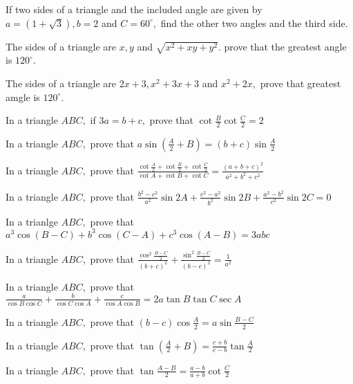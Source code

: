 \item If two sides of a triangle and the included angle are given by $a = (1 + \sqrt{3}), b = 2$ and $C=60^\circ,$ find
    the other two angles and the third side.

\item The sides of a triangle are $x, y$ and $\sqrt{x^2 + xy + y^2}.$ prove that the greatest angle is $120^\circ.$

\item The sides of a triangle are $2x + 3, x^2 + 3x + 3$ and $x^2 + 2x,$ prove that greatest amgle is $120^\circ.$

\item In a triangle $ABC,$ if $3a = b + c,$ prove that $\cot\frac{B}{2}\cot\frac{C}{2} = 2$

\item In a triangle $ABC,$ prove that $a\sin\left(\frac{A}{2} + B\right) = (b + c)\sin\frac{A}{2}$

\item In a triangle $ABC,$ prove that $\frac{\cot\frac{A}{2} + \cot\frac{B}{2} + \cot\frac{C}{2}}{\cot A + \cot B + \cot
    C} = \frac{(a + b + c)^2}{a^2 + b^2 + c^2}$

\item In a triangle $ABC,$ prove that $\frac{b^2 - c^2}{a^2}\sin2A + \frac{c^2 - a^2}{b^2}\sin2B + \frac{a^2 -
    b^2}{c^2}\sin2C = 0$

\item In a trianlge $ABC,$ prove that $a^3\cos(B - C) + b^3\cos(C - A) + c^3\cos(A - B) = 3abc$

\item In a triangle $ABC,$ prove that $\frac{\cos^2\frac{B - C}{2}}{(b + c)^2} + \frac{\sin^2\frac{B - C}{2}}{(b - c)^2}
    = \frac{1}{a^2}$

\item In a triangle $ABC,$ prove that $\frac{a}{\cos B\cos C} + \frac{b}{\cos C\cos A} + \frac{c}{\cos A\cos B} = 2a\tan
    B\tan C\sec A$

\item In a triangle $ABC,$ prove that $(b - c)\cos\frac{A}{2} = a\sin\frac{B - C}{2}$

\item In a triangle $ABC,$ prove that $\tan\left(\frac{A}{2} + B\right) = \frac{c + b}{c - b}\tan \frac{A}{2}$

\item In a triangle $ABC,$ prove that $\tan\frac{A - B}{2} = \frac{a - b}{a + b}\cot\frac{C}{2}$

